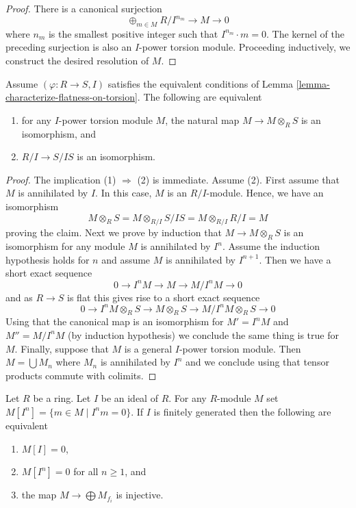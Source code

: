 \begin{proof}
There is a canonical surjection
$$
\oplus_{m \in M} R/I^{n_m} \to M \to 0
$$
where $n_m$ is the smallest positive integer such that $I^{n_m} \cdot m = 0$.
The kernel of the preceding surjection is also an $I$-power torsion module.
Proceeding inductively, we construct the desired resolution of $M$.
\end{proof}

\begin{lemma}
\label{lemma-neighbourhood-isomorphism}
Assume $(\varphi : R \to S, I)$ satisfies the equivalent conditions of
Lemma \ref{lemma-characterize-flatness-on-torsion}.
The following are equivalent
\begin{enumerate}
\item for any $I$-power torsion module $M$, the natural map
$M \to M \otimes_R S$ is an isomorphism, and
\item $R/I \to S/IS$ is an isomorphism.
\end{enumerate}
\end{lemma}

\begin{proof}
The implication (1) $\Rightarrow$ (2) is immediate.
Assume (2). First assume that $M$ is annihilated by $I$.
In this case, $M$ is an $R/I$-module. Hence, we have an isomorphism  
$$
M \otimes_R S = M \otimes_{R/I} S/IS = M \otimes_{R/I} R/I = M
$$
proving the claim. Next we prove by induction that $M \to M \otimes_R S$
is an isomorphism for any module $M$ is annihilated by $I^n$. Assume
the induction hypothesis holds for $n$ and assume $M$ is annihilated by
$I^{n + 1}$. Then we have a short exact sequence
$$
0 \to I^nM \to M \to M/I^nM \to 0
$$
and as $R \to S$ is flat this gives rise to a short exact sequence
$$
0 \to I^nM \otimes_R S \to M \otimes_R S \to M/I^nM \otimes_R S \to 0
$$
Using that the canonical map is an isomorphism for $M' = I^nM$ and
$M'' = M/I^nM$ (by induction hypothesis) we conclude the same thing is
true for $M$. Finally, suppose that $M$ is a general $I$-power torsion
module. Then $M = \bigcup M_n$ where $M_n$ is annihilated by $I^n$
and we conclude using that tensor products commute with colimits.
\end{proof}

\begin{lemma}
\label{lemma-torsion-free}
Let $R$ be a ring. Let $I$ be an ideal of $R$.
For any $R$-module $M$ set $M[I^n] = \{m \in M \mid I^nm = 0\}$.
If $I$ is finitely generated then the following are equivalent
\begin{enumerate}
\item $M[I] = 0$,
\item $M[I^n] = 0$ for all $n \geq 1$, and
\item the map $M \to \bigoplus M_{f_i}$ is injective.
\end{enumerate}
\end{lemma}

